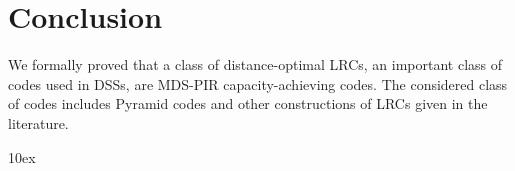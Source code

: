 \documentclass[twocolumn,conference]{IEEEtran}
\begin{document}




\section{Conclusion}

We formally proved that a class of distance-optimal LRCs, an important class of codes used in DSSs, are MDS-PIR capacity-achieving codes. %
 The considered class of codes  includes Pyramid codes and other constructions of LRCs given in the literature.
 

%
%

\balance


{\small \itemsep 10ex

}
\end{document}
